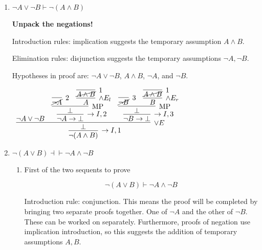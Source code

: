 \documentclass[11pt]{report}
\begin{document}
\begin{enumerate}
\begin{enumerate}
		\newpage
		\item $\lnot A \lor \lnot B \vdash \lnot(A \land B)$
				
		\hspace{0.2cm}{\bf Solution}

		{\bf Unpack the negations!}

		Introduction rules: implication suggests the temporary assumption $A \land B$.

		\vspace{0.2cm}

		Elimination rules: disjunction suggests the temporary assumptions $\lnot A, \lnot B$. 

		\vspace{0.2cm}

		Hypotheses in proof are: $\lnot A \lor \lnot B$, $A \land B$, $\lnot A$, and $\lnot B$. 

		\begin{mdframed}
			\begin{center}
				$\begin{array}{c}
					\infer[\to I,1]{\lnot(A \land B)}
						{\infer[\lor E]{\bot}
							{\lnot A \lor \lnot B &
							\infer[\to I,2]{\lnot A \to \bot}
								{\infer[\MP]{\bot}
									{\infer[2]{\cancel{\lnot A}}{}
									&
									\infer[\land E_{l}]{A}{\infer[1]{\cancel{A \land B}}{}}}}
								&
							\infer[\to I,3]{\lnot B \to \bot}
								{\infer[\MP]{\bot}
									{\infer[3]{\cancel{\lnot B}}{} 
									&
									\infer[\land E_{r}]{B}{\infer[1]{\cancel{A \land B}}{}}}}}}
				\end{array}$
			\end{center}
		\end{mdframed}
		
		\newpage
		\item $\lnot(A \lor B) \dashv\vdash \lnot A \land \lnot B$
				
		\hspace{0.2cm}{\bf Solution}
		
		\begin{enumerate}
		
			\item First of the two sequents to prove 
			
			$$\lnot(A \lor B) \vdash \lnot A \land \lnot B$$			
			
			Introduction rule: conjunction. This means the proof will be completed by bringing two separate proofs together. One of $\lnot A$ and the other of $\lnot B$. These can be worked on separately. Furthermore, proofs of negation use implication introduction, so this suggests the addition of temporary assumptions $A,B$.
			

\end{enumerate}
\end{enumerate}
\end{enumerate}
\end{document}
